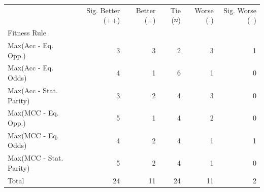\begin{tabular}{lrrrrr}
\toprule
 & Sig. Better (++) & Better (+) & Tie (≈) & Worse (-) & Sig. Worse (--) \\
Fitness Rule &  &  &  &  &  \\
\midrule
Max(Acc - Eq. Opp.) & 3 & 3 & 2 & 3 & 1 \\
Max(Acc - Eq. Odds) & 4 & 1 & 6 & 1 & 0 \\
Max(Acc - Stat. Parity) & 3 & 2 & 4 & 3 & 0 \\
Max(MCC - Eq. Opp.) & 5 & 1 & 4 & 2 & 0 \\
Max(MCC - Eq. Odds) & 4 & 2 & 4 & 1 & 1 \\
Max(MCC - Stat. Parity) & 5 & 2 & 4 & 1 & 0 \\
Total & 24 & 11 & 24 & 11 & 2 \\
\bottomrule
\end{tabular}
